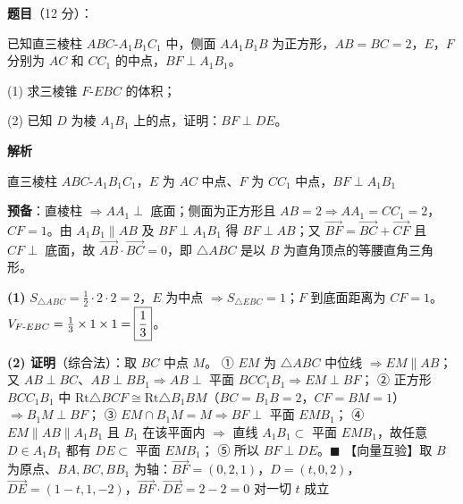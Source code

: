 \begin{answer}

\textbf{题目}（12 分）：

已知直三棱柱 $ABC\text{-}A_1B_1C_1$ 中，侧面 $AA_1B_1B$ 为正方形，$AB=BC=2$，$E$，$F$ 分别为 $AC$ 和 $CC_1$ 的中点，$BF\perp A_1B_1$。
\nopagebreak[4]
\begin{center}\end{center}
\nopagebreak[4]
  (1) 求三棱锥 $F\text{-}EBC$ 的体积；

  (2) 已知 $D$ 为棱 $A_1B_1$ 上的点，证明：$BF\perp DE$。

\textbf{解析}

直三棱柱 $ABC\text{-}A_1B_1C_1$，$E$ 为 $AC$ 中点、$F$ 为 $CC_1$ 中点，$BF\perp A_1B_1$

\begin{gktip}
\textbf{预备}：直棱柱 $\Rightarrow AA_1\perp$ 底面；侧面为正方形且 $AB=2\Rightarrow AA_1=CC_1=2$，$CF=1$。由 $A_1B_1\parallel AB$ 及 $BF\perp A_1B_1$ 得 $BF\perp AB$；又 $\overrightarrow{BF}=\overrightarrow{BC}+\overrightarrow{CF}$ 且 $CF\perp$ 底面，故 $\overrightarrow{AB}\cdot\overrightarrow{BC}=0$，即 $\triangle ABC$ 是以 $B$ 为直角顶点的等腰直角三角形。

\textbf{(1)} $S_{\triangle ABC}=\tfrac12\cdot2\cdot2=2$，$E$ 为中点 $\Rightarrow S_{\triangle EBC}=1$；$F$ 到底面距离为 $CF=1$。
$V_{F\text-EBC}=\tfrac13\times1\times1=\boxed{\dfrac13}$。

\textbf{(2) 证明}（综合法）：取 $BC$ 中点 $M$。
① $EM$ 为 $\triangle ABC$ 中位线 $\Rightarrow EM\parallel AB$；又 $AB\perp BC$、$AB\perp BB_1\Rightarrow AB\perp$ 平面 $BCC_1B_1\Rightarrow EM\perp BF$；
② 正方形 $BCC_1B_1$ 中 $\mathrm{Rt}\triangle BCF\cong\mathrm{Rt}\triangle B_1BM$（$BC=B_1B=2$，$CF=BM=1$）$\Rightarrow B_1M\perp BF$；
③ $EM\cap B_1M=M\Rightarrow BF\perp$ 平面 $EMB_1$；
④ $EM\parallel AB\parallel A_1B_1$ 且 $B_1$ 在该平面内 $\Rightarrow$ 直线 $A_1B_1\subset$ 平面 $EMB_1$，故任意 $D\in A_1B_1$ 都有 $DE\subset$ 平面 $EMB_1$；
⑤ 所以 $BF\perp DE$。$\blacksquare$
【向量互验】取 $B$ 为原点、$BA,BC,BB_1$ 为轴：$\overrightarrow{BF}=(0,2,1)$，$D=(t,0,2)$，$\overrightarrow{DE}=(1-t,1,-2)$，$\overrightarrow{BF}\cdot\overrightarrow{DE}=2-2=0$ 对一切 $t$ 成立 
\end{gktip}



\end{answer}
